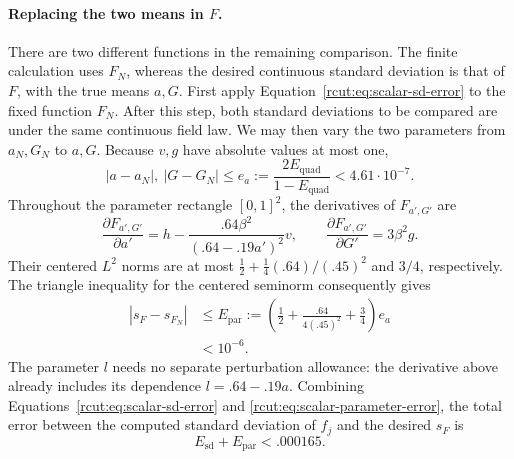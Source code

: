 \paragraph{Replacing the two means in \(F\).}
There are two different functions in the remaining comparison. The
finite calculation uses \(F_N\), whereas the desired continuous
standard deviation is that of \(F\), with the true means \(a,G\).
First apply Equation~\eqref{rcut:eq:scalar-sd-error} to the fixed
function \(F_N\). After this step, both standard deviations to be
compared are under the same continuous field law. We may then vary
the two parameters from \(a_N,G_N\) to \(a,G\).
Because \(v,g\) have absolute values at most one,
\begin{equation}
 |a-a_N|,\ |G-G_N|\leq e_a:=\frac{2E_{\mathrm{quad}}}{1-E_{\mathrm{quad}}}
 <4.61\cdot10^{-7}.
 \label{rcut:eq:scalar-mean-error}
\end{equation}
Throughout the parameter rectangle \([0,1]^2\), the derivatives of
\(F_{a',G'}\) are
\[
 \frac{\partial F_{a',G'}}{\partial a'}
   =h-\frac{.64\beta^2}{(.64-.19a')^2}v,
 \qquad
 \frac{\partial F_{a',G'}}{\partial G'}=3\beta^2g.
\]
Their centered \(L^2\) norms are at most
\(\tfrac12+\tfrac14(.64)/(.45)^2\) and \(3/4\), respectively.
The triangle inequality for the centered seminorm consequently gives
\begin{equation}
 \begin{split}
 |s_F-s_{F_N}|&\leq E_{\mathrm{par}}
 :=\left(\frac12+\frac{.64}{4(.45)^2}+\frac34\right)e_a\\
 &<10^{-6}.
 \end{split}
 \label{rcut:eq:scalar-parameter-error}
\end{equation}
The parameter \(l\) needs no separate perturbation allowance: the
derivative above already includes its dependence \(l=.64-.19a\).
Combining Equations~\eqref{rcut:eq:scalar-sd-error} and
\eqref{rcut:eq:scalar-parameter-error}, the total error between the
computed standard deviation of \(f_j\) and the desired \(s_F\) is
\begin{equation}
 E_{\mathrm{sd}}+E_{\mathrm{par}}
 <.000165.
 \label{rcut:eq:scalar-total-error}
\end{equation}

